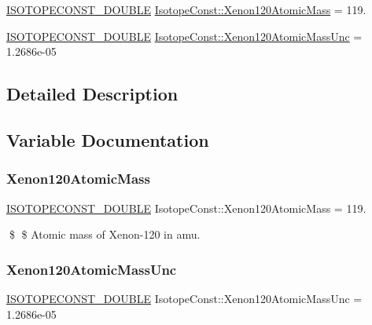 \begin{DoxyCompactItemize}
\item 
\mbox{\hyperlink{group___isotope_const-_macros_ga8f45a7272ce02c0b4c65c44636ed719a}{I\+S\+O\+T\+O\+P\+E\+C\+O\+N\+S\+T\+\_\+\+D\+O\+U\+B\+LE}} \mbox{\hyperlink{group___isotope_const-_xenon-_xe120_ga346fb8170a2079320dd8aaad041d2af0}{Isotope\+Const\+::\+Xenon120\+Atomic\+Mass}} = 119.
\item 
\mbox{\hyperlink{group___isotope_const-_macros_ga8f45a7272ce02c0b4c65c44636ed719a}{I\+S\+O\+T\+O\+P\+E\+C\+O\+N\+S\+T\+\_\+\+D\+O\+U\+B\+LE}} \mbox{\hyperlink{group___isotope_const-_xenon-_xe120_gafb1e094e6d05dac2d0978a4e56310919}{Isotope\+Const\+::\+Xenon120\+Atomic\+Mass\+Unc}} = 1.\+2686e-\/05
\end{DoxyCompactItemize}


\subsection{Detailed Description}


\subsection{Variable Documentation}
\mbox{\label{group___isotope_const-_xenon-_xe120_ga346fb8170a2079320dd8aaad041d2af0}} 
\subsubsection{\texorpdfstring{Xenon120\+Atomic\+Mass}{Xenon120AtomicMass}}
{\footnotesize\ttfamily \mbox{\hyperlink{group___isotope_const-_macros_ga8f45a7272ce02c0b4c65c44636ed719a}{I\+S\+O\+T\+O\+P\+E\+C\+O\+N\+S\+T\+\_\+\+D\+O\+U\+B\+LE}} Isotope\+Const\+::\+Xenon120\+Atomic\+Mass = 119.}

\$ \$ Atomic mass of Xenon-\/120 in amu. \mbox{\label{group___isotope_const-_xenon-_xe120_gafb1e094e6d05dac2d0978a4e56310919}} 
\subsubsection{\texorpdfstring{Xenon120\+Atomic\+Mass\+Unc}{Xenon120AtomicMassUnc}}
{\footnotesize\ttfamily \mbox{\hyperlink{group___isotope_const-_macros_ga8f45a7272ce02c0b4c65c44636ed719a}{I\+S\+O\+T\+O\+P\+E\+C\+O\+N\+S\+T\+\_\+\+D\+O\+U\+B\+LE}} Isotope\+Const\+::\+Xenon120\+Atomic\+Mass\+Unc = 1.\+2686e-\/05}

